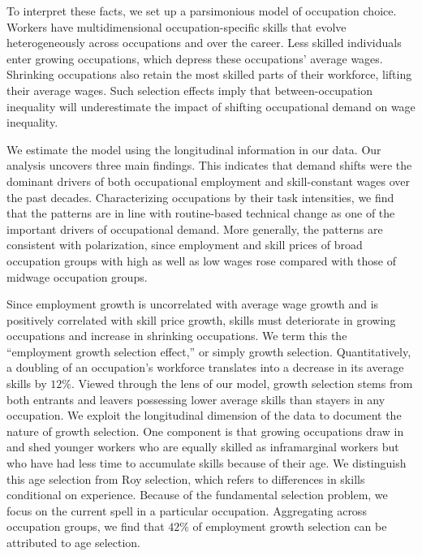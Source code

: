 \documentclass[12pt]{article}
\newcommand{\highlightR}[1]{{\emph{\color{MyRed}{#1}}}}
\newcommand{\highlightP}[1]{{\emph{\color{MyPink}{#1}}}}
\theoremstyle{definition}
\begin{document}
To interpret these facts, we set up a parsimonious model of occupation choice. Workers have multidimensional occupation-specific skills that evolve heterogeneously across occupations and over the career. \highlightR{The central distinction we make is between skill prices -- wages paid per constant unit of skill -- and average occupational wages.} \highlightP{While skill prices are directly affected by shifts in demand, selection may dampen, neutralize, or even overturn their effects on average wages.} Less skilled individuals enter growing occupations, which depress these occupations' average wages. Shrinking occupations also retain the most skilled parts of their workforce, lifting their average wages. Such selection effects imply that between-occupation inequality will underestimate the impact of shifting occupational demand on wage inequality.

We estimate the model using the longitudinal information in our data. Our analysis uncovers three main findings. \highlightP{First, there is a clear positive relation between skill price and employment growth at the level of detailed occupations.} This indicates that demand shifts were the dominant drivers of both occupational employment and skill-constant wages over the past decades. Characterizing occupations by their task intensities, we find that the patterns are in line with routine-based technical change as one of the important drivers of occupational demand. More generally, the patterns are consistent with polarization, since employment and skill prices of broad occupation groups with high as well as low wages rose compared with those of midwage occupation groups. 

Since employment growth is uncorrelated with average wage growth and is positively correlated with skill price growth, skills must deteriorate in growing occupations and increase in shrinking occupations. \highlightP{Our second main finding is that lower-earning workers' net entry into growing occupations and their net exit out of shrinking occupations fully account for the negative relationship between skill changes and employment growth.} We term this the ``employment growth selection effect,'' or simply growth selection. Quantitatively, a doubling of an occupation's workforce translates into a decrease in its average skills by $12\%$. Viewed through the lens of our model, growth selection stems from both entrants and leavers possessing lower average skills than stayers in any occupation. We exploit the longitudinal dimension of the data to document the nature of growth selection. One component is that growing occupations draw in and shed younger workers who are equally skilled as inframarginal workers but who have had less time to accumulate skills because of their age. We distinguish this age selection from Roy selection, which refers to differences in skills conditional on experience. Because of the fundamental selection problem, we focus on the current spell in a particular occupation. Aggregating across occupation groups, we find that $42\%$ of employment growth selection can be attributed to age selection.
\end{document}
